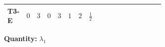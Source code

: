 \documentclass[8pt]{article}
\begin{document}
\begin{landscape}
\begin{longtable}{@{}llcccccc >{\raggedright\arraybackslash}p{0.21\linewidth} >{\raggedright\arraybackslash}p{0.21\linewidth} >{\raggedright\arraybackslash}p{0.21\linewidth}@{}}
\midrule
T3-E & $0$ & $3$ & $0$ & $3$ & $1$ & $2$ & $\frac{1}{2}$ & \scriptsize\adjustbox{max width=\linewidth}{$\begin{gathered} {\lambda_1} (12 \operatorname{Tr}\!\left({Y_d}\,\left({Y_d}\right)^{\dagger}\right)+4 \operatorname{Tr}\!\left({Y_e}\,\left({Y_e}\right)^{\dagger}\right)+12 \operatorname{Tr}\!\left({Y_u}\,\left({Y_u}\right)^{\dagger}\right))\end{gathered}$} & \scriptsize\adjustbox{max width=\linewidth}{$\begin{gathered} -12 \operatorname{Tr}\!\left({Y_d}\,\left({Y_d}\right)^{\dagger}\,{Y_d}\,\left({Y_d}\right)^{\dagger}\right)\end{gathered}$} & \scriptsize\adjustbox{max width=\linewidth}{$\begin{gathered} -4 \operatorname{Tr}\!\left({Y_e}\,\left({Y_e}\right)^{\dagger}\,{Y_e}\,\left({Y_e}\right)^{\dagger}\right)\end{gathered}$} \\
\midrule
\bottomrule
\end{longtable}
\clearpage
\noindent\textbf{Quantity: }$\lambda_1$\par\smallskip

\end{landscape}
\end{document}
